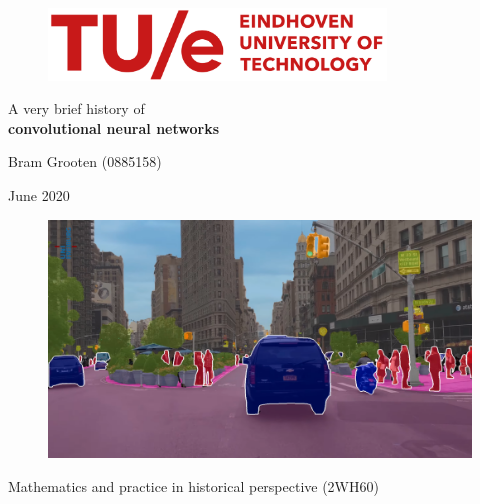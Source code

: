 
\begin{figure}[H]
    \centering
    \includegraphics[width=0.8\textwidth]{images/TUe-new-logo.png}
\end{figure}

\vspace{1.2cm}

\begin{center}
\huge{A very brief history of\\ \textbf{convolutional neural networks}}\\

\vspace{0.5cm}

\Large{Bram Grooten (0885158)}\\

\vspace{0.2cm}

\Large{June 2020}\\

\vspace{1.4cm}

\begin{figure}[H]
    \centering
    \includegraphics[width=\textwidth]{images/effPS-still23m12s.png}
\end{figure}

\vspace{1.4cm}

Mathematics and practice in historical perspective (2WH60)
\end{center}